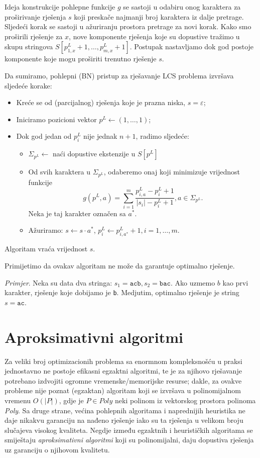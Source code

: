 \documentclass[a4paper, utf8, 11pt, colorlinks]{book}
\begin{document}
 Ideja konstrukcije pohlepne funkcije $g$ se sastoji u odabiru onog karaktera za proširivanje rješenja $s$ koji preskače najmanji broj karaktera iz dalje pretrage. Sljedeći korak se sastoji u ažuriranju prostora pretrage za novi korak. Kako smo proširili rješenje za $x$, nove komponente rješenja koje su dopustive tražimo u skupu stringova $S[p^L_{1,x}+1,\ldots, p^L_{m, x}+1]$. Postupak nastavljamo dok god postoje komponente koje mogu proširiti trenutno rješenje $s$. 


\noindent Da sumiramo, pohlepni (BN) pristup za rješavanje LCS problema izvršava sljedeće korake:
\begin{itemize}
	\item Kreće se od (parcijalnog) rješenja koje je prazna niska, $s=\varepsilon$;
	\item Iniciramo pozicioni vektor $p^L \gets (1,\ldots, 1) $;
	\item Dok god jedan od $p^L_i$ nije jednak $n+1$, radimo sljedeće: 
	\begin{itemize}
   	     \item $\Sigma_{p^L} \gets$ naći dopustive ekstenzije u $S[p^L]$
	      \item Od svih karaktera u $\Sigma_{p^L}$, odaberemo onaj koji minimizuje vrijednost funkcije 
	      $$g( p^L,a) = \sum_{i=1}^m\frac{p^L_{i,a} - p^L_i + 1 }{|s_i| - p^L_i + 1 }, a \in \Sigma_{ p^L }.$$
	      Neka je taj karakter označen sa $a^*$. 
	      \item Ažuriramo: $s \gets  s \cdot a^*$, $p^L_i \gets p^L_{i, a^*} +1, i = 1,\ldots,m.$
    \end{itemize}
\end{itemize}
Algoritam vraća vrijednost $s$. 

Primijetimo da ovakav algoritam ne može da garantuje optimalno rješenje. 

\noindent \emph{Primjer}.  Neka su data dva stringa: $s_1 = \texttt{acb}, s_2 = \texttt{bac}$. Ako uzmemo  $ b$ kao prvi karakter, rješenje koje dobijamo je \texttt{b}. Medjutim, optimalno rješenje je string $s=\texttt{ac}$. 

\section{Aproksimativni algoritmi}
  
   Za veliki broj optimizacionih problema sa enormnom kompleksnošću u praksi jednostavno ne postoje efikasni egzaktni algoritmi, te je za  njihovo rješavanje potrebano izdvojiti ogromne vremenske/memorijske resurse; dakle, za  ovakve probleme nije poznat (egzaktan) algoritam koji se izvršava u polinomijalnom vremenu $O(|P|)$, gdje je $P \in {Poly}$ neki polinom iz vektorskog prostora polinoma \emph{Poly}. Sa druge strane, većina pohlepnih algoritama i naprednijih heuristika ne daje nikakvu garanciju na nađeno rješenje iako su ta rješenja u velikom broju slučajeva visokog kvaliteta. Negdje između egzaktnih i heurističkih algoritama se smiještaju \emph{aproksimativni algoritmi} koji su polinomijalni, daju dopustiva rješenja uz garanciju o njihovom kvalitetu. 
  
\end{document}
